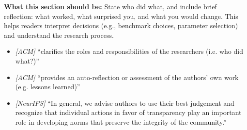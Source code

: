 \noindent\textbf{What this section should be:}
State who did what, and include brief reflection: what worked, what surprised you, and what you would change. This helps readers interpret decisions (e.g., benchmark choices, parameter selection) and understand the research process.
\begin{itemize}
  \item \textit{[ACM]} ``clarifies the roles and responsibilities of the researchers (i.e. who did what?)''
  \item \textit{[ACM]} ``provides an auto-reflection or assessment of the authors’ own work (e.g. lessons learned)''
  \item \textit{[NeurIPS]} ``In general, we advise authors to use their best judgement and recognize that individual actions in favor of transparency play an important role in developing norms that preserve the integrity of the community.''
\end{itemize}